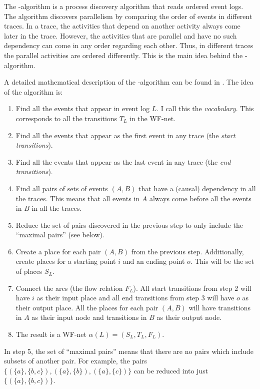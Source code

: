 The \textalpha-algorithm is a process discovery algorithm that reads ordered event logs.
The algorithm discovers parallelism by comparing the order of events in different traces.
In a trace, the activities that depend on another activity always come later in the trace.
However, the activities that are parallel and have no such dependency can come in any order regarding each other.
Thus, in different traces the parallel activities are ordered differently. 
This is the main idea behind the \textalpha-algorithm.

A detailed mathematical description of the \textalpha-algorithm can be found in \cite{van2004workflow}.
The idea of the algorithm is:

\begin{enumerate}
    \item Find all the events that appear in event log $L$. I call this the \emph{vocabulary}. This corresponds to all the transitions $T_L$ in the WF-net.
    \item Find all the events that appear as the first event in any trace (the \emph{start transitions}).
    \item Find all the events that appear as the last event in any trace (the \emph{end transitions}).
    \item Find all pairs of sets of events $(A,B)$ that have a (causal) dependency in all the traces. This means that all events in $A$ always come before all the events in $B$ in all the traces.
    \item Reduce the set of pairs discovered in the previous step to only include the ``maximal pairs'' (see below). 
    \item Create a place for each pair $(A,B)$ from the previous step. Additionally, create places for a starting point $i$ and an ending point $o$. This will be the set of places $S_L$.
    \item Connect the arcs (the flow relation $F_L$). All start transitions from step 2 will have $i$ as their input place and all end transitions from step 3 will have $o$ as their output place. All the places for each pair $(A,B)$ will have transitions in $A$ as their input node and transitions in $B$ as their output node.
    \item The result is a WF-net $\alpha(L) = ( S_L, T_L, F_L )$.
\end{enumerate}

In step 5, the set of ``maximal pairs'' means that there are no pairs which include subsets of another pair. For example, the pairs $\{(\{a\},\{b,c\}),(\{a\},\{b\}),(\{a\},\{c\})\}$ can be reduced into just $\{(\{a\},\{b,c\})\}$.

